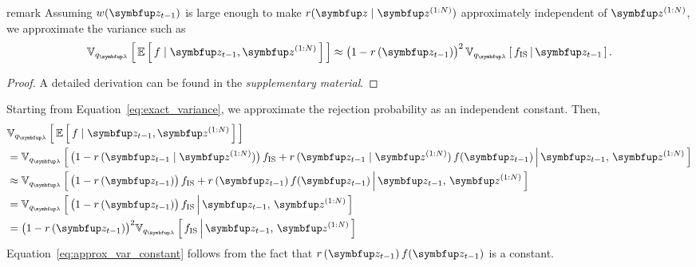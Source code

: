 
\begin{theoremEnd}{remark}\label{thm:approx_var}
  Assuming \(w(\vz_{t-1})\) is large enough to make \(r(\vz\mid\vz^{(1:N)})\) approximately independent of \(\vz^{(1:N)}\), we approximate the variance such as
  \begin{align}
    \Vsub{q_{\vlambda}}{ \E{ f \mid \vz_{t-1}, \vz^{(1:N)} } } \approx {\big(1 - r\,(\vz_{t-1})\big)}^2\,\Vsub{q_{\vlambda}}{ f_{\text{IS}} \,\middle\vert\, \vz_{t-1} }.
  \end{align}
\end{theoremEnd}
\begin{proof}
  A detailed derivation can be found in the \textit{supplementary material}.
\end{proof}
\begin{proofEnd}
  Starting from Equation~\eqref{eq:exact_variance}, we approximate the rejection probability as an independent constant.
  Then,
  \begin{align}
    &\Vsub{q_{\vlambda}}{ \E{ f \mid \vz_{t-1}, \vz^{(1:N)} } } \\
    &= \Vsub{q_{\vlambda}}{ \big(1 - r\,(\vz_{t-1}\mid\vz^{(1:N)})\big)\, f_{\mathrm{IS}}
      + r\,(\vz_{t-1}\mid\vz^{(1:N)})\,f(\vz_{t-1}) \,\middle\vert\, \vz_{t-1},\, \vz^{(1:N)} } \\
    &\approx \Vsub{q_{\vlambda}}{ \big(1 - r\,(\vz_{t-1})\big)\, f_{\mathrm{IS}}
      + r\,(\vz_{t-1})\,f(\vz_{t-1}) \,\middle\vert\, \vz_{t-1},\, \vz^{(1:N)} } \\
    &= \Vsub{q_{\vlambda}}{ \big(1 - r\,(\vz_{t-1})\big)\, f_{\mathrm{IS}} \,\middle\vert\, \vz_{t-1},\, \vz^{(1:N)} } \label{eq:approx_var_constant} \\
    &= {\big(1 - r\,(\vz_{t-1})\big)}^2 \Vsub{q_{\vlambda}}{ f_{\mathrm{IS}} \,\middle\vert\, \vz_{t-1},\, \vz^{(1:N)} } \label{eq:approx_var_linear} 
  \end{align}
  Equation~\eqref{eq:approx_var_constant} follows from the fact that \(r\,(\vz_{t-1})\,f(\vz_{t-1})\) is a constant.
\end{proofEnd}

